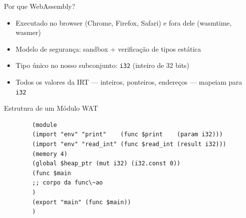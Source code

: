 \begin{frame}[fragile]{Por que WebAssembly?}

    \begin{itemize}

        \item
        Executado no browser (Chrome, Firefox, Safari) e fora dele (wasmtime,
        wasmer)
        \item
        Modelo de segurança: sandbox + verificação de tipos estática
        \item
        Tipo único no nosso subconjunto: \texttt{i32}
        (inteiro de 32 bits)
        \item
        Todos os valores da IRT --- inteiros, ponteiros, endereços --- mapeiam
        para \texttt{i32}
    \end{itemize}
\end{frame}



\begin{frame}[fragile]{Estrutura de um Módulo WAT}

    \begin{lstlisting}
        (module
        (import "env" "print"    (func $print    (param i32)))
        (import "env" "read_int" (func $read_int (result i32)))
        (memory 4)
        (global $heap_ptr (mut i32) (i32.const 0))
        (func $main
        ;; corpo da func\~ao
        )
        (export "main" (func $main))
        )
    \end{lstlisting}

\end{frame}

